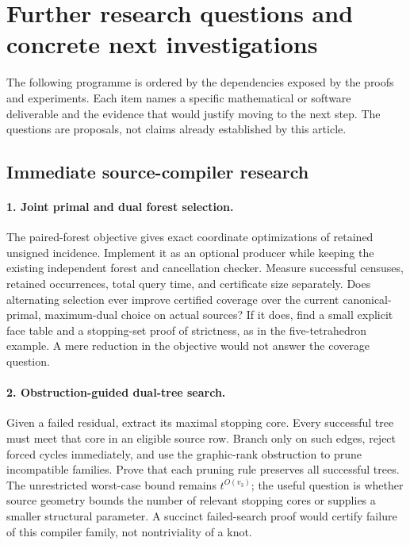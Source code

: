 \section{Further research questions and concrete next investigations}
\label{sec:agenda}

The following programme is ordered by the dependencies exposed by the
proofs and experiments. Each item names a specific mathematical or software
deliverable and the evidence that would justify moving to the next step.
The questions are proposals, not claims already established by this article.

\subsection{Immediate source-compiler research}

\paragraph{1. Joint primal and dual forest selection.}
The paired-forest objective gives exact coordinate optimizations of retained
unsigned incidence. Implement it as an optional producer while keeping the
existing independent forest and cancellation checker. Measure successful
censuses, retained occurrences, total query time, and certificate size
separately. Does alternating selection ever improve certified coverage over
the current canonical-primal, maximum-dual choice on actual sources?
If it does, find a small explicit face table and a stopping-set proof of
strictness, as in the five-tetrahedron example. A mere reduction in the
objective would not answer the coverage question.

\paragraph{2. Obstruction-guided dual-tree search.}
Given a failed residual, extract its maximal stopping core. Every successful
tree must meet that core in an eligible source row. Branch only on such
edges, reject forced cycles immediately, and use the graphic-rank
obstruction to prune incompatible families. Prove that each pruning rule
preserves all successful trees. The unrestricted worst-case bound remains
$t^{O(v_3)}$; the useful question is whether source geometry bounds the
number of relevant stopping cores or supplies a smaller structural
parameter. A succinct failed-search proof would certify failure of this
compiler family, not nontriviality of a knot.

